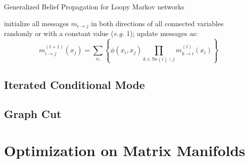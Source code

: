 \begin{algorithm}
	\caption{Generalized Belief Propagation for Loopy Markov networks}
	\label{alg:LBP}
\begin{algorithmic}[1]
\STATE  initialize all messages $m_{i\rightarrow j}$ in both directions of all connected variables randomly or with a constant value (\emph{e.g.} 1);
\STATE  update messages as:
\begin{equation*}
  m^{(t+1)}_{i \rightarrow j}(x_j)= \sum_{x_i}\left\{\phi(x_i,x_j) \prod_{k\in \text{Ne}(i)\backslash j} m^{(t)}_{k \rightarrow i}(x_i)\right\}
\end{equation*}
\ENDWHILE
\end{algorithmic}
\end{algorithm}


\subsection{Iterated Conditional Mode}
\subsection{Graph Cut}

\section{Optimization on Matrix Manifolds}


